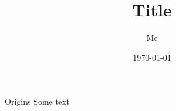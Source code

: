 \documentclass[17pt]{beamer}
\title[Title]{Title}
\author[Me]{Me}
\date[Test]{\today}
\begin{document}
\begin{frame}[plain]
    \titlepage    
\end{frame}

\begin{frame}{Origins}
Some text
\end{frame}
\end{document}
